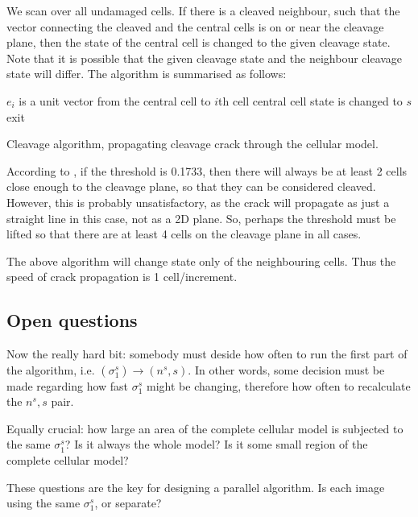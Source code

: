 We scan over all undamaged cells.
If there is a cleaved neighbour,
such that the vector connecting the
cleaved and the central cells is on
or near the cleavage plane, then the
state of the central cell is changed
to the given cleavage state.
Note that it is possible that the given
cleavage state and the neighbour cleavage
state will differ.
The algorithm is summarised as follows:

\begin{algorithm}[H]
\SetAlgoLined

\BlankLine
  {
   {
   $e_i$ is a unit vector from
    the central cell to $i$th cell\;
    {
    central cell state is changed to $s$\;
    exit\;
   }
  }
 }
\caption{
Cleavage algorithm, propagating cleavage
crack through the cellular model.
}
\label{algo:clvg2}
\end{algorithm}

According to \cite{shterenlikht2013c},
if the threshold is 0.1733, then there will
always be at least 2 cells close enough
to the cleavage plane, so that they can
be considered cleaved.
However, this is probably unsatisfactory,
as the crack will propagate as just a straight
line in this case, not as a 2D plane.
So, perhaps the threshold must be lifted so
that there are at least 4 cells on the cleavage
plane in all cases.

The above algorithm will change state only of the
neighbouring cells.
Thus the speed of crack propagation is 1 cell/increment.

\subsection{Open questions}

Now the really hard bit: somebody must deside how often
to run the first part of the algorithm, i.e.
$(\sigma_1^s) \to (n^s,s)$.
In other words, some decision must be made regarding
how fast $\sigma_1^s$ might be changing, therefore
how often to recalculate the $n^s,s$ pair.

Equally crucial: how large an area of the complete
cellular model is subjected to the same $\sigma_1^s$?
Is it always the whole model?
Is it some small region of the complete cellular model?

These questions are the key for designing a parallel
algorithm.
Is each image using the same $\sigma_1^s$, or
separate?

